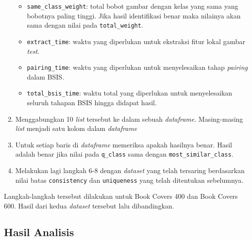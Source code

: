 \begin{enumerate}
\begin{itemize}
		\item \texttt{same\_class\_weight}: total bobot gambar dengan kelas yang sama yang bobotnya paling tinggi. Jika hasil identifikasi benar maka nilainya akan sama dengan nilai pada \texttt{total\_weight}.
		\item \texttt{extract\_time}: waktu yang diperlukan untuk ekstraksi fitur lokal gambar \textit{test}.
		\item \texttt{pairing\_time}: waktu yang diperlukan untuk menyelesaikan tahap \textit{pairing} dalam BSIS.
		\item \texttt{total\_bsis\_time}: waktu total yang diperlukan untuk menyelesaikan seluruh tahapan BSIS hingga didapat hasil.
	\end{itemize}
	\item Menggabungkan 10 \textit{list} tersebut ke dalam sebuah \textit{dataframe}. Masing-masing \textit{list} menjadi satu kolom dalam \textit{dataframe}
	\item Untuk setiap baris di \textit{dataframe} memeriksa apakah hasilnya benar. Hasil adalah benar jika nilai pada \texttt{q\_class} sama dengan \texttt{most\_similar\_class}. 
	\item Melakukan lagi langkah 6-8 dengan \textit{dataset} yang telah tersaring berdasarkan nilai batas \texttt{consistency} dan \texttt{uniqueness} yang telah ditentukan sebelumnya.
\end{enumerate}
Langkah-langkah tersebut dilakukan untuk Book Covers 400 dan Book Covers 600. Hasil dari kedua \textit{dataset} tersebut lalu dibandingkan.

\subsection{Hasil Analisis}
